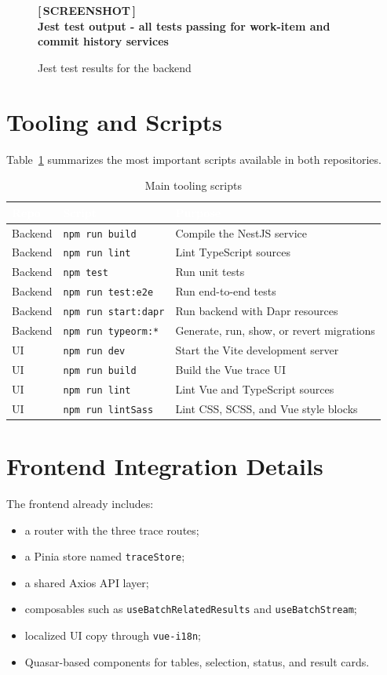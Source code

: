 \documentclass[12pt,a4paper]{report}
\newcommand{\screenshot}[2][Screenshot placeholder]{%
  \begin{figure}[H]
    \centering
    \begin{tcolorbox}[
      enhanced,
      colback=screenshotbg,
      colframe=screenshotborder,
      boxrule=1pt,
      arc=4pt,
      left=4pt, right=4pt, top=4pt, bottom=4pt,
      width=\textwidth,
      height=7cm,
      valign=center,
    ]
      \centering
      \color{primary}
      \large\bfseries [\,SCREENSHOT\,]\\[6pt]
      \normalsize\normalfont\color{darkgray}#1
    \end{tcolorbox}
    \caption{#2}
  \end{figure}%
}
\newcommand{\code}[1]{\texttt{\small\color{codered}#1}}
\begin{document}
\screenshot[Jest test output - all tests passing for work-item and commit history services]{Jest test results for the backend}

\section{Tooling and Scripts}

Table~\ref{tab:tooling-scripts} summarizes the most important scripts available
in both repositories.

\begin{table}[H]
\centering
\caption{Main tooling scripts}
\label{tab:tooling-scripts}
\begin{tabularx}{\textwidth}{|p{2.5cm}|p{4.2cm}|X|}
\hline
\rowcolor{primary}
  \textcolor{white}{\textbf{Repo}} &
  \textcolor{white}{\textbf{Script}} &
  \textcolor{white}{\textbf{Purpose}} \\
\hline
Backend & \code{npm run build}       & Compile the NestJS service \\
Backend & \code{npm run lint}        & Lint TypeScript sources \\
Backend & \code{npm test}            & Run unit tests \\
Backend & \code{npm run test:e2e}    & Run end-to-end tests \\
Backend & \code{npm run start:dapr}  & Run backend with Dapr resources \\
Backend & \code{npm run typeorm:*}   & Generate, run, show, or revert migrations \\
UI      & \code{npm run dev}         & Start the Vite development server \\
UI      & \code{npm run build}       & Build the Vue trace UI \\
UI      & \code{npm run lint}        & Lint Vue and TypeScript sources \\
UI      & \code{npm run lintSass}    & Lint CSS, SCSS, and Vue style blocks \\
\hline
\end{tabularx}
\end{table}

\section{Frontend Integration Details}

The frontend already includes:

\begin{itemize}
  \item a router with the three trace routes;
  \item a Pinia store named \code{traceStore};
  \item a shared Axios API layer;
  \item composables such as \code{useBatchRelatedResults} and \code{useBatchStream};
  \item localized UI copy through \code{vue-i18n};
  \item Quasar-based components for tables, selection, status, and result cards.
\end{itemize}
\end{document}
